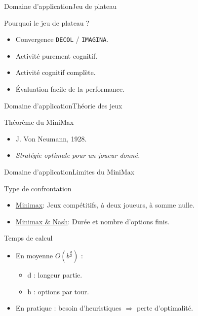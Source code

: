 \begin{frame}{Domaine d'application}{Jeu de plateau}

\begin{block}{Pourquoi le jeu de plateau ?}
\begin{itemize}
\item Convergence \texttt{DECOL} / \texttt{IMAGINA}.
\pause
\item Activité purement cognitif.
\pause
\item Activité cognitif complète.
\pause
\item Évaluation facile de la performance.
\end{itemize}
\end{block}

\end{frame}


\begin{frame}{Domaine d'application}{Théorie des jeux}

\begin{block}{Théorème du MiniMax}
\begin{itemize}
\item J. Von Neumann, 1928.
\item \textit{Stratégie optimale pour un joueur donné.}
\end{itemize}
\end{block}
\end{frame}



\begin{frame}{Domaine d'application}{Limites du MiniMax}

\begin{block}{Type de confrontation}
\begin{itemize}
\item \underline{Minimax}: Jeux compétitifs, à deux joueurs, à somme nulle.
\item \underline{Minimax \& Nash}: Durée et nombre d'options finis.
\end{itemize}
\end{block}

\pause

\begin{block}{Temps de calcul}
\begin{itemize}
\item En moyenne \emph{$O(b^{\frac{d}{2}})$} :
	\begin{itemize}
	\item d : longeur partie.
	\item b : options par tour.
	\end{itemize}
\item En pratique : besoin d'heuristiques $\Rightarrow$ perte d'optimalité.
\end{itemize}
\end{block}

\end{frame}